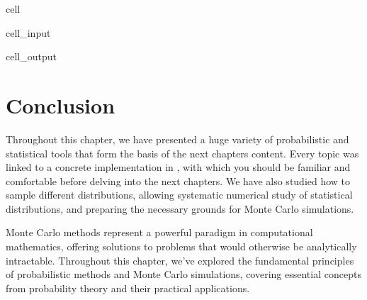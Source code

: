 \documentclass[letterpaper,10pt,english]{jupyterBook}
\begin{document}
\begin{sphinxuseclass}{cell}
\begin{sphinxVerbatimInput}
\begin{sphinxuseclass}{cell_input}
\begin{sphinxVerbatim}[commandchars=\\\{\}]
   
\end{sphinxVerbatim}

\end{sphinxuseclass}\end{sphinxVerbatimInput}
\begin{sphinxVerbatimOutput}

\begin{sphinxuseclass}{cell_output}
\noindent{}

\end{sphinxuseclass}\end{sphinxVerbatimOutput}

\end{sphinxuseclass}

\section{Conclusion}
\label{\detokenize{01:conclusion}}
\sphinxAtStartPar
Throughout this chapter, we have presented a huge variety of probabilistic and statistical tools that form the basis of the next chapters content. Every topic was linked to a concrete implementation in , with which you should be familiar and comfortable before delving into the next chapters. We have also studied how to sample different distributions, allowing systematic numerical study of statistical distributions, and preparing the necessary grounds for Monte Carlo simulations.

\sphinxAtStartPar
Monte Carlo methods represent a powerful paradigm in computational mathematics, offering solutions to problems that would otherwise be analytically intractable. Throughout this chapter, we’ve explored the fundamental principles of probabilistic methods and Monte Carlo simulations, covering essential concepts from probability theory and their practical applications.
\end{document}
